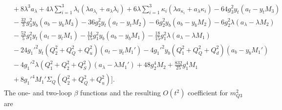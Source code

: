 \documentclass[preprint,amsmath,amssymb,aps,superscriptaddress,prd,showpacs,floatfix,nofootinbib]{revtex4-1}
\begin{document}
\begin{subequations}
\begin{align}
&{}+8\lambda^3a_{\lambda}+4\lambda\sum_{i=1}^3\lambda_i\left ( \lambda a_{\lambda_i}+a_{\lambda}\lambda_i\right )+6\lambda\sum_{i=1}^3\kappa_i\left ( \lambda a_{\kappa_i}+a_{\lambda}\kappa_i\right )-64g_3^2y_t\left ( a_t-y_tM_3\right )\nonumber\\
&{}-\frac{32}{3}g_3^2y_b\left ( a_b-y_bM_3\right )-36g_2^2y_t\left ( a_t-y_tM_2\right )-6g_2^2y_b\left ( a_b-y_bM_2\right )-6g_2^2\lambda\left ( a_\lambda-\lambda M_2\right )\nonumber\\
&{}-\frac{52}{5}g_1^2y_t\left ( a_t-y_tM_1\right )-\frac{14}{15}g_1^2y_b\left ( a_b-y_bM_1\right )-\frac{18}{15}g_1^2\lambda \left ( a_\lambda-\lambda M_1\right )\nonumber\\
&{}-24g_1'^2y_t\left ( Q_2^2+Q_Q^2+Q_u^2\right )\left ( a_t-y_tM_1'\right )-4g_1'^2y_b\left ( Q_1^2+Q_Q^2+Q_d^2\right )\left ( a_b-y_bM_1'\right )\nonumber\\
&{}-4g_1'^2\lambda \left ( Q_1^2+Q_2^2+Q_S^2\right )\left ( a_\lambda-\lambda M_1'\right )+48g_2^4M_2+\frac{832}{25}g_1^4M_1\nonumber\\
&{}+8g_1'^4M_1'\Sigma_Q\left ( Q_2^2+Q_Q^2+Q_u^2\right )\bigg ].\label{eq:USSMTYu22Ot2Coeff}
\end{align}
\end{subequations}
The one- and two-loop $\beta$ functions and the resulting $O(t^2)$ coefficient for $m_{Q3}^2$ are 
\end{document}
